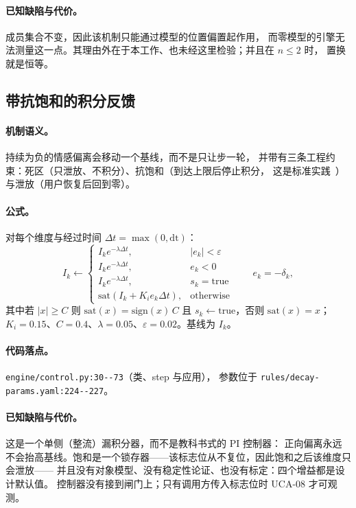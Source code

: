\paragraph{已知缺陷与代价。} 成员集合不变，因此该机制只能通过模型的位置偏置起作用，
而零模型的引擎无法测量这一点。其理由外在于本工作、也未经这里检验；并且在 $n \le 2$ 时，
置换就是恒等。

\subsection{带抗饱和的积分反馈}

\paragraph{机制语义。} 持续为负的情感偏离会移动一个基线，而不是只让步一轮，
并带有三条工程约束：死区（只泄放、不积分）、抗饱和（到达上限后停止积分，
这是标准实践~\cite{astrom2006}）与泄放（用户恢复后回到零）。

\paragraph{公式。} 对每个维度与经过时间 $\Delta t = \max(0, \mathrm{dt})$：
\begin{equation}
I_k \leftarrow
\begin{cases}
I_k e^{-\lambda \Delta t}, & \lvert e_k \rvert < \varepsilon\\
I_k e^{-\lambda \Delta t}, & e_k < 0\\
I_k e^{-\lambda \Delta t}, & s_k = \mathrm{true}\\
\mathrm{sat}(I_k + K_i e_k \Delta t), & \text{otherwise}
\end{cases}
\qquad e_k = -\delta_k,
\end{equation}
其中若 $\lvert x \rvert \ge C$ 则 $\mathrm{sat}(x) = \mathrm{sign}(x)\,C$ 且
$s_k \leftarrow \mathrm{true}$，否则 $\mathrm{sat}(x)=x$；
$K_i=0.15$、$C=0.4$、$\lambda=0.05$、$\varepsilon=0.02$。基线为 $I_k$。

\paragraph{代码落点。} \texttt{engine/\allowbreak{}control.\allowbreak{}py:\allowbreak{}30-\allowbreak{}-\allowbreak{}73}（类、step 与应用），
参数位于 \texttt{rules/\allowbreak{}decay-\allowbreak{}params.\allowbreak{}yaml:\allowbreak{}224-\allowbreak{}-\allowbreak{}227}。

\paragraph{已知缺陷与代价。} 这是一个单侧（整流）漏积分器，而不是教科书式的 PI 控制器：
正向偏离永远不会抬高基线。饱和是一个锁存器——该标志位从不复位，因此饱和之后该维度只会泄放——
并且没有对象模型、没有稳定性论证、也没有标定：四个增益都是设计默认值。
控制器没有接到闸门上；只有调用方传入标志位时 UCA-08 才可观测。

